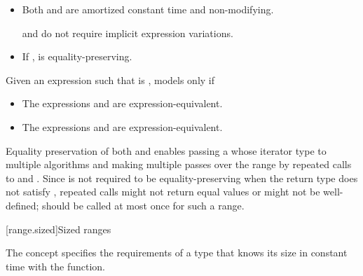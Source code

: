 {\begin{itemdescr}
\begin{itemize}
\item Both
and
are amortized constant time and non-modifying.
\begin{note}
and
do not require implicit expression
variations.
\end{note}

\item If 
  ,
is equality-preserving.
\end{itemize}

{\color{newclr}
\pnum
Given an expression  such that  is ,
 models  only if
\begin{itemize}
\item The expressions  and 
are expression-equivalent.

\item The expressions  and 
are expression-equivalent.
\end{itemize}
} %
\end{itemdescr}

\pnum
\begin{note}
Equality preservation of both  and
 enables passing a  whose iterator
type    to multiple
algorithms and making multiple passes over the range by repeated calls to
 and .
Since  is not required to be equality-preserving
when the return type does not satisfy , repeated calls
might not return equal values or might not be well-defined;
 should be called at most once for such a range.
\end{note}

[range.sized]{Sized ranges}

\pnum
The  concept specifies the requirements
of a  type that knows its size in constant time with the
 function.

}

